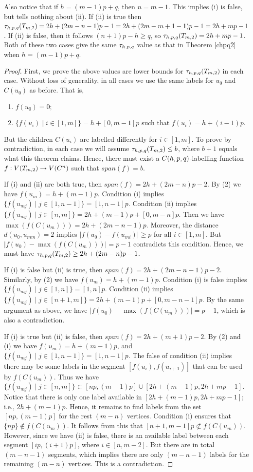 Also notice that if $h = (m-1)p+q$, then $n = m-1$. This implies (i) is false, but tells nothing about (ii). If (ii) is true then $\thpq(\tm2) = 2h+(2m-n-1)p-1 = 2h+(2m-m+1-1)p-1=2h+mp-1$. If (ii) is false, then it follows $(n+1)p - h \ge q$, so $\thpq(\tm2) = 2h+mp-1$. Both of these two cases give the same $\tau_{h,p,q}$ value as that in Theorem \ref{chpq2} when $h = (m-1)p+q$. 
\\
\begin{proof}
First, we prove the above values are lower bounds for $\thpq(\tm2)$ in each case. Without loss of generality, in all cases we use the same labels for $u_0$ and $C(u_0)$ as before. That is,  

\begin{enumerate}[(1)]
\item $f(u_0) = 0$;
\item $\{f(u_i) \mid i \in [1,m]\} = h + [0,m-1]p$ such that $f(u_i) = h + (i-1)p$. 
\end{enumerate}
But the children $C(u_i)$ are labelled differently for $i \in [1,m]$. To prove by contradiction, in each case we will assume $\thpq(\tm2) \le b$, where $b+1$ equals what this theorem claims. Hence, there must exist a $C(h,p,q)$-labelling function $f:V(\tm2) \rightarrow V(C^n)$ such that $span(f) = b$.  

If (i) and (ii) are both true, then $span(f)= 2h+(2m-n)p-2$. By (2) we have $f(u_m) = h+(m-1)p$. Condition (i) implies  $\{f(u_{mj}) \mid j \in [1,n-1]\}=[1,n-1]p$. Condition (ii) implies $\{f(u_{mj}) \mid j \in [n, m]\} =2h+(m-1)p+[0,m-n]p$. Then we have $\max(f(C(u_m)))= 2h+(2m-n-1)p$. Moreover, the distance $d(u_0, u_{mm}) = 2$ implies $|f(u_0)-f(u_{mi})| \ge p$ for all $i \in [1,m]$. But $|f(u_0) - \max(f(C(u_m)))| =p-1$ contradicts this condition. Hence, we must have $\thpq(\tm2) \ge 2h+(2m-n)p-1$. 

If (i) is false but (ii) is true, then $span(f) = 2h+(2m-n-1)p-2$. Similarly, by (2) we have $f(u_m) = h+(m-1)p$. Condition (i) is false implies $\{f(u_{mj}) \mid j \in [1,n]\}=[1,n]p$. Condition (ii) implies $\{f(u_{mj}) \mid j \in [n+1, m]\} = 2h+(m-1)p+[0,m-n-1]p$. By the same argument as above, we have $|f(u_0) - \max(f(C(u_m)))| = p-1$, which is also a contradiction. 

If (i) is true but (ii) is false, then $span(f) = 2h+(m+1)p-2$. By (2) and (i) we have $f(u_m) = h+(m-1)p$, and $\{f(u_{mj}) \mid j \in [1,n-1]\} = [1,n-1]p$. The false of condition (ii) implies there may be some labels in the segment $[f(u_i), f(u_{i+1})]$ that can be used by $f(C(u_m))$. Thus we have $\{f(u_{mj}) \mid j \in [n, m]\} \subset [np, (m-1)p] \cup [2h+(m-1)p, 2h+mp-1]$. Notice that there is only one label available in $[2h+(m-1)p, 2h+mp-1]$; i.e.,  $2h+(m-1)p$. Hence, it remains to find labels from the set $[np, (m-1)p]$ for the rest $(m-n)$ vertices. Condition (i) ensures that $\{np\} \not\in f(C(u_m))$. It follows from this that $[n+1,m-1]p \not\subset f(C(u_m))$. However, since we have (ii) is false, there is an available label between each segment $[ip, (i+1)p]$, where $i \in [n, m-2]$. But there are in total $(m-n-1)$ segments, which implies there are only $(m-n-1)$ labels for the remaining $(m-n)$ vertices. This is a contradiction. 


\end{proof}
